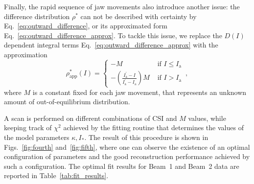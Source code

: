 Finally, the rapid sequence of jaw movements also introduce another issue: the difference distribution $\rho^\ast$ can not be described with certainty by Eq.~\eqref{eq:outward_difference}, or its approximated form Eq.~\eqref{eq:outward_difference_approx}. To tackle this issue, we replace the $D(I)$ dependent integral terms Eq.~\eqref{eq:outward_difference_approx} with the approximation
\begin{equation}
    \rho_{\mathrm{app}}^{\ast}(I)= \begin{cases} -M & \text { if } I\leq I_{\mathrm{a}}\\ -\left(\frac{I_{\mathrm{a}}^{\prime }-I}{I_{\mathrm{a}}^{ \prime}-I_{\mathrm{a}}}\right) M & \text { if } I>I_{\mathrm{a}}  \end{cases} \, ,
    \label{eq:approximated_distribution_beam}
\end{equation}
where $M$ is a constant fixed for each jaw movement, that represents an unknown amount of out-of-equilibrium distribution.

A scan is performed on different combinations of CSI and $M$ values, while keeping track of $\chi^2$ achieved by the fitting routine that determines the values of the model parameters $\kappa, I_\ast$. The result of this procedure is shown in Figs.~\ref{fig:fourth} and~\ref{fig:fifth}, where one can observe the existence of an optimal configuration of parameters and the good reconstruction performance achieved by such a configuration. The optimal fit results for Beam~1 and Beam~2 data are reported in Table~\ref{tab:fit_results}.


